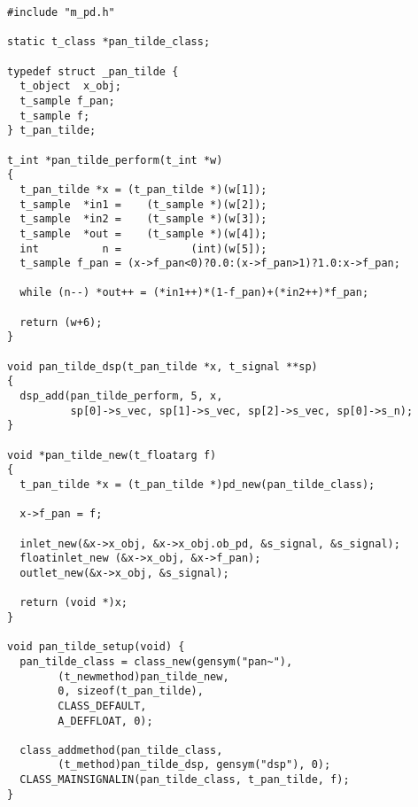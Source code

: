 \documentclass[12pt, a4paper,english,titlepage]{article}
\begin{document}
\begin{verbatim}
#include "m_pd.h"

static t_class *pan_tilde_class;

typedef struct _pan_tilde {
  t_object  x_obj;
  t_sample f_pan;
  t_sample f;
} t_pan_tilde;

t_int *pan_tilde_perform(t_int *w)
{
  t_pan_tilde *x = (t_pan_tilde *)(w[1]);
  t_sample  *in1 =    (t_sample *)(w[2]);
  t_sample  *in2 =    (t_sample *)(w[3]);
  t_sample  *out =    (t_sample *)(w[4]);
  int          n =           (int)(w[5]);
  t_sample f_pan = (x->f_pan<0)?0.0:(x->f_pan>1)?1.0:x->f_pan;

  while (n--) *out++ = (*in1++)*(1-f_pan)+(*in2++)*f_pan;

  return (w+6);
}

void pan_tilde_dsp(t_pan_tilde *x, t_signal **sp)
{
  dsp_add(pan_tilde_perform, 5, x,
          sp[0]->s_vec, sp[1]->s_vec, sp[2]->s_vec, sp[0]->s_n);
}

void *pan_tilde_new(t_floatarg f)
{
  t_pan_tilde *x = (t_pan_tilde *)pd_new(pan_tilde_class);

  x->f_pan = f;
  
  inlet_new(&x->x_obj, &x->x_obj.ob_pd, &s_signal, &s_signal);
  floatinlet_new (&x->x_obj, &x->f_pan);
  outlet_new(&x->x_obj, &s_signal);

  return (void *)x;
}

void pan_tilde_setup(void) {
  pan_tilde_class = class_new(gensym("pan~"),
        (t_newmethod)pan_tilde_new,
        0, sizeof(t_pan_tilde),
        CLASS_DEFAULT, 
        A_DEFFLOAT, 0);

  class_addmethod(pan_tilde_class,
        (t_method)pan_tilde_dsp, gensym("dsp"), 0);
  CLASS_MAINSIGNALIN(pan_tilde_class, t_pan_tilde, f);
}
\end{verbatim}
\end{document}
